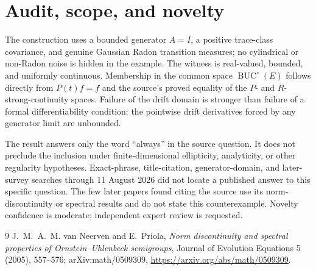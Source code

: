 \documentclass[11pt]{article}
\newcommand{\BUC}{\operatorname{BUC}}
\begin{document}
\section{\texorpdfstring{\hspace{0.35em}}{}Audit, scope, and novelty}

The construction uses a bounded generator $A=I$, a positive trace-class
covariance, and genuine Gaussian Radon transition measures; no cylindrical
or non-Radon noise is hidden in the example.  The witness is real-valued,
bounded, and uniformly continuous.  Membership in the common space
$\BUC^\circ(E)$ follows directly from $P(t)f=f$ and the source's proved
equality of the $P$- and $R$-strong-continuity spaces.  Failure of the drift
domain is stronger than failure of a formal differentiability condition:
the pointwise drift derivatives forced by any generator limit are unbounded.

The result answers only the word ``always'' in the source question.  It does
not preclude the inclusion under finite-dimensional ellipticity, analyticity,
or other regularity hypotheses.  Exact-phrase, title-citation, generator-domain,
and later-survey searches through 11 August 2026 did not locate a published
answer to this specific question.  The few later papers found citing the source
use its norm-discontinuity or spectral results and do not state this
counterexample.  Novelty confidence is moderate; independent expert review is
requested.

\begin{thebibliography}{9}
J.~M.~A.~M. van Neerven and E.~Priola,
\emph{Norm discontinuity and spectral properties of Ornstein--Uhlenbeck
semigroups}, Journal of Evolution Equations 5 (2005), 557--576;
arXiv:math/0509309,
\url{https://arxiv.org/abs/math/0509309}.
\end{thebibliography}
\end{document}

